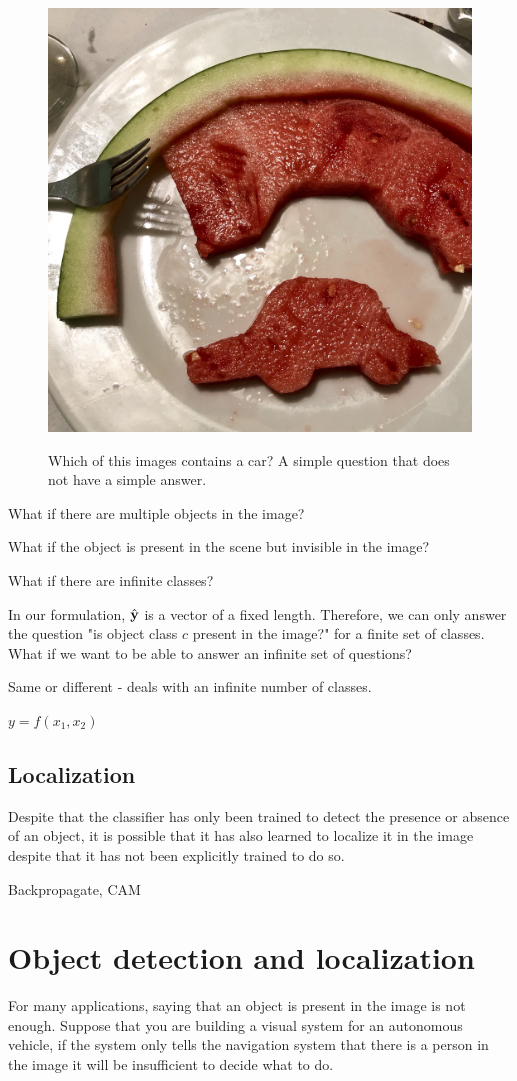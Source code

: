 \begin{figure}
{		\includegraphics[width=0.32\linewidth]{figures/object_recognition/IMG_9325.jpeg}
	}
	\caption{Which of this images contains a car? A simple question that does not have a simple answer.}
	\label{fig:whatisacar}
\end{figure}

What if there are multiple objects in the image?

What if the object is present in the scene but invisible in the image?


What if there are infinite classes?

In our formulation, $\hat {\bf y}$ is a vector of a fixed length. Therefore, we can only answer the question "is object class $c$ present in the image?" for a finite set of classes. What if we want to be able to answer an infinite set of questions?


Same or different
- deals with an infinite number of classes.

$y = f(x_1,x_2)$

\subsection{Localization}

Despite that the classifier has only been trained to detect the presence or absence of an object, it is possible that it has also learned to localize it in the image despite that it has not been explicitly trained to do so.


Backpropagate, CAM

\section{Object detection and localization}

For many applications, saying that an object is present in the image is not enough. Suppose that you are building a visual system for an autonomous vehicle, if the system only tells the navigation system that there is a person in the image it will be insufficient to decide what to do.

